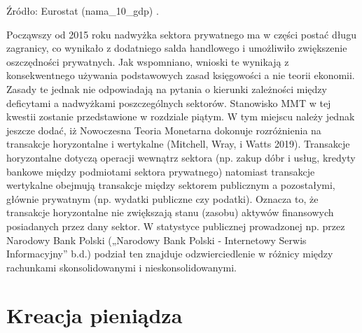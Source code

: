 \documentclass[
]{book}
\begin{document}
Źródło: Eurostat (nama\_10\_gdp) .

Począwszy od 2015 roku nadwyżka sektora prywatnego ma w części postać długu zagranicy, co wynikało z dodatniego salda handlowego i umożliwiło zwiększenie oszczędności prywatnych.
Jak wspomniano, wnioski te wynikają z konsekwentnego używania podstawowych zasad księgowości a nie teorii ekonomii. Zasady te jednak nie odpowiadają na pytania o kierunki zależności między deficytami a nadwyżkami poszczególnych sektorów. Stanowisko MMT w tej kwestii zostanie przedstawione w rozdziale piątym.
W tym miejscu należy jednak jeszcze dodać, iż Nowoczesna Teoria Monetarna dokonuje rozróżnienia na transakcje horyzontalne i wertykalne (Mitchell, Wray, i Watts 2019). Transakcje horyzontalne dotyczą operacji wewnątrz sektora (np. zakup dóbr i usług, kredyty bankowe między podmiotami sektora prywatnego) natomiast transakcje wertykalne obejmują transakcje między sektorem publicznym a pozostałymi, głównie prywatnym (np. wydatki publiczne czy podatki). Oznacza to, że transakcje horyzontalne nie zwiększają stanu (zasobu) aktywów finansowych posiadanych przez dany sektor. W statystyce publicznej prowadzonej np. przez Narodowy Bank Polski („Narodowy Bank Polski - Internetowy Serwis Informacyjny'' b.d.) podział ten znajduje odzwierciedlenie w różnicy między rachunkami skonsolidowanymi i nieskonsolidowanymi.

\hypertarget{kreacja-pieniux105dza}{%
\section{Kreacja pieniądza}\label{kreacja-pieniux105dza}}
\end{document}
